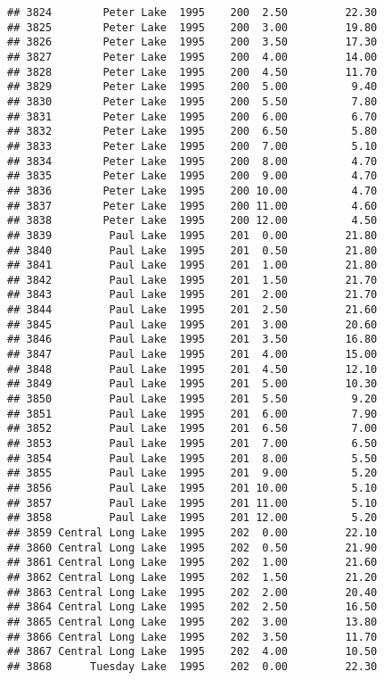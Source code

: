 \documentclass[
]{article}
\begin{document}
\begin{verbatim}
## 3824        Peter Lake  1995    200  2.50         22.30
## 3825        Peter Lake  1995    200  3.00         19.80
## 3826        Peter Lake  1995    200  3.50         17.30
## 3827        Peter Lake  1995    200  4.00         14.00
## 3828        Peter Lake  1995    200  4.50         11.70
## 3829        Peter Lake  1995    200  5.00          9.40
## 3830        Peter Lake  1995    200  5.50          7.80
## 3831        Peter Lake  1995    200  6.00          6.70
## 3832        Peter Lake  1995    200  6.50          5.80
## 3833        Peter Lake  1995    200  7.00          5.10
## 3834        Peter Lake  1995    200  8.00          4.70
## 3835        Peter Lake  1995    200  9.00          4.70
## 3836        Peter Lake  1995    200 10.00          4.70
## 3837        Peter Lake  1995    200 11.00          4.60
## 3838        Peter Lake  1995    200 12.00          4.50
## 3839         Paul Lake  1995    201  0.00         21.80
## 3840         Paul Lake  1995    201  0.50         21.80
## 3841         Paul Lake  1995    201  1.00         21.80
## 3842         Paul Lake  1995    201  1.50         21.70
## 3843         Paul Lake  1995    201  2.00         21.70
## 3844         Paul Lake  1995    201  2.50         21.60
## 3845         Paul Lake  1995    201  3.00         20.60
## 3846         Paul Lake  1995    201  3.50         16.80
## 3847         Paul Lake  1995    201  4.00         15.00
## 3848         Paul Lake  1995    201  4.50         12.10
## 3849         Paul Lake  1995    201  5.00         10.30
## 3850         Paul Lake  1995    201  5.50          9.20
## 3851         Paul Lake  1995    201  6.00          7.90
## 3852         Paul Lake  1995    201  6.50          7.00
## 3853         Paul Lake  1995    201  7.00          6.50
## 3854         Paul Lake  1995    201  8.00          5.50
## 3855         Paul Lake  1995    201  9.00          5.20
## 3856         Paul Lake  1995    201 10.00          5.10
## 3857         Paul Lake  1995    201 11.00          5.10
## 3858         Paul Lake  1995    201 12.00          5.20
## 3859 Central Long Lake  1995    202  0.00         22.10
## 3860 Central Long Lake  1995    202  0.50         21.90
## 3861 Central Long Lake  1995    202  1.00         21.60
## 3862 Central Long Lake  1995    202  1.50         21.20
## 3863 Central Long Lake  1995    202  2.00         20.40
## 3864 Central Long Lake  1995    202  2.50         16.50
## 3865 Central Long Lake  1995    202  3.00         13.80
## 3866 Central Long Lake  1995    202  3.50         11.70
## 3867 Central Long Lake  1995    202  4.00         10.50
## 3868      Tuesday Lake  1995    202  0.00         22.30

\end{verbatim}
\end{document}
